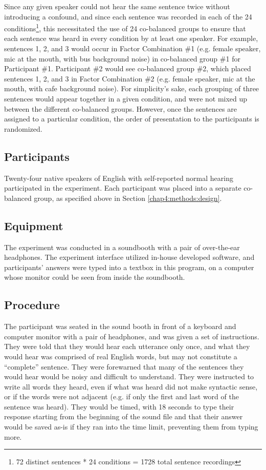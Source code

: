 \documentclass[dissertation,copyright]{uathesis}
\begin{document}
Since any given speaker could not hear the same sentence twice without introducing a confound, and since each sentence was recorded in each of the 24 conditions\footnote{72 distinct sentences * 24 conditions = 1728 total sentence recordings}, this necessitated the use of 24 co-balanced groups to ensure that each sentence was heard in every condition by at least one speaker.  For example, sentences 1, 2, and 3 would occur in Factor Combination \#1 (e.g. female speaker, mic at the mouth, with bus background noise) in co-balanced group \#1 for Participant \#1. Participant \#2 would see co-balanced group \#2, which placed sentences 1, 2, and 3 in Factor Combination \#2 (e.g. female speaker, mic at the mouth, with cafe background noise).  For simplicity's sake, each grouping of three sentences would appear together in a given condition, and were not mixed up between the different co-balanced groups.  However, once the sentences are assigned to a particular condition, the order of presentation to the participants is randomized.

\subsection{Participants}

Twenty-four native speakers of English with self-reported normal hearing participated in the experiment. Each participant was placed into a separate co-balanced group, as specified above in Section \ref{chap4:methods:design}.

\subsection{Equipment}

The experiment was conducted in a soundbooth with a pair of over-the-ear headphones.  The experiment interface utilized in-house developed software, and participants' answers were typed into a textbox in this program, on a computer whose monitor could be seen from inside the soundbooth.

\subsection{Procedure}
\label{hsp-main-procedure}

The participant was seated in the sound booth in front of a keyboard and computer monitor with a pair of headphones, and was given a set of instructions. They were told that they would hear each utterance only once, and what they would hear was comprised of real English words, but may not constitute a ``complete'' sentence.  They were forewarned that many of the sentences they would hear would be noisy and difficult to understand. They were instructed to write all words they heard, even if what was heard did not make syntactic sense, or if the words were not adjacent (e.g. if only the first and last word of the sentence was heard). They would be timed, with 18 seconds to type their response starting from the beginning of the sound file and that their answer would be saved as-is if they ran into the time limit, preventing them from typing more.
\end{document}
